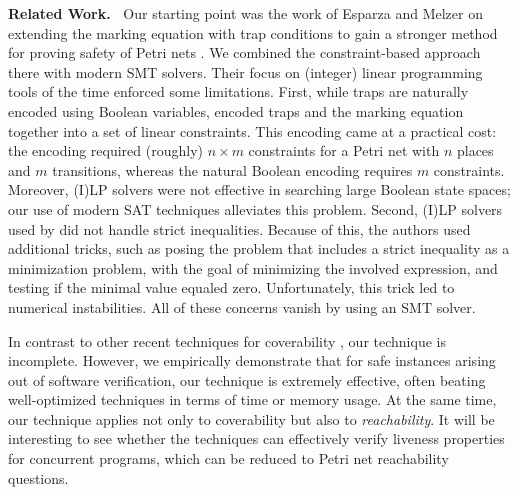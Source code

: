 \smallskip
\noindent\textbf{Related Work.\ }
%
Our starting point was the work of Esparza and Melzer on
extending the marking equation with trap conditions to gain a stronger method
for proving safety of Petri nets \cite{EsparzaM00}. We combined the
constraint-based approach there with modern SMT solvers.
Their focus on (integer) linear programming tools of the time enforced some limitations. 
First, while traps are naturally encoded using Boolean variables,
\cite{EsparzaM00} encoded traps and the marking equation together into a set of 
linear constraints.
This encoding came at a practical cost: the encoding required (roughly) $n\times m$ constraints
for a Petri net with $n$ places and $m$ transitions, whereas the natural Boolean encoding
requires $m$ constraints.
Moreover, (I)LP solvers were not effective in searching large Boolean state
spaces; our use of modern SAT techniques alleviates this problem. 
Second, (I)LP solvers used by \cite{EsparzaM00} did not handle strict inequalities. 
Because of this, the authors used additional tricks, such as posing the problem that includes a 
strict inequality as a minimization problem, with the goal of minimizing the involved expression, 
and testing if the minimal value equaled zero. 
Unfortunately, this trick led to numerical instabilities. 
All of these concerns vanish by using an SMT solver.

In contrast to other recent techniques for coverability \cite{GantyFI08,KaiserKWCONCUR12,KloosMNP13},
our technique is incomplete.
However, we empirically demonstrate that for safe instances arising out of software verification,
our technique is extremely effective, often beating well-optimized techniques in terms of time or memory usage.
At the same time, our technique applies not only to coverability but also to \emph{reachability}.
It will be interesting to see whether the techniques can effectively verify liveness properties for concurrent
programs, which can be reduced to Petri net reachability questions.


